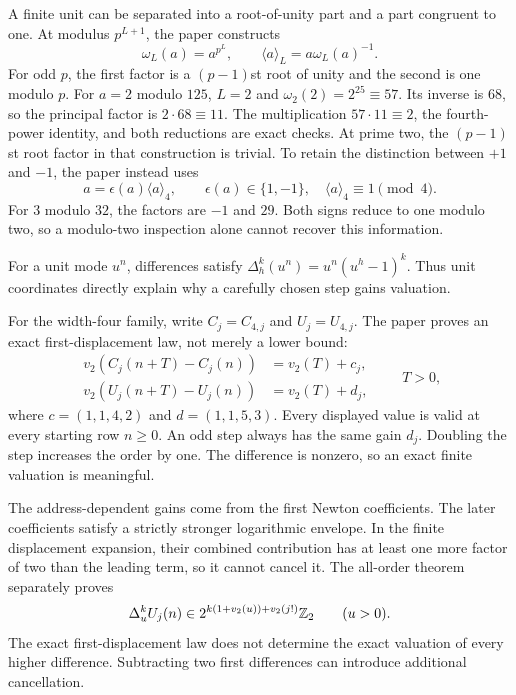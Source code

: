 A finite unit can be separated into a root-of-unity part and a part congruent to one. At modulus $p^{L+1}$, the paper constructs
\[
 \omega_L(a)=a^{p^L},\qquad
 \langle a\rangle_L=a\omega_L(a)^{-1}.
\]
For odd $p$, the first factor is a $(p-1)$st root of unity and the second is one modulo $p$.
For $a=2$ modulo $125$, $L=2$ and $\omega_2(2)=2^{25}\equiv57$. Its inverse is $68$, so the principal factor is $2\cdot68\equiv11$. The multiplication $57\cdot11\equiv2$, the fourth-power identity, and both reductions are exact checks.
At prime two, the $(p-1)$st root factor in that construction is trivial. To retain the distinction between $+1$ and $-1$, the paper instead uses
\[
 a=\epsilon(a)\langle a\rangle_4,\qquad
 \epsilon(a)\in\{1,-1\},\quad\langle a\rangle_4\equiv1\pmod4.
\]
For $3$ modulo $32$, the factors are $-1$ and $29$. Both signs reduce to one modulo two, so a modulo-two inspection alone cannot recover this information.

For a unit mode $u^n$, differences satisfy $\Delta_h^k(u^n)=u^n(u^h-1)^k$. Thus unit coordinates directly explain why a carefully chosen step gains valuation.

For the width-four family, write $C_j=C_{4,j}$ and $U_j=U_{4,j}$. The paper proves an exact first-displacement law, not merely a lower bound:
\[
 \begin{aligned}
 v_2(C_j(n+T)-C_j(n))&=v_2(T)+c_j,\\
 v_2(U_j(n+T)-U_j(n))&=v_2(T)+d_j,
 \end{aligned}\qquad T>0,
\]
where $c=(1,1,4,2)$ and $d=(1,1,5,3)$.
Every displayed value is valid at every starting row $n\ge0$. An odd step always has the same gain $d_j$. Doubling the step increases the order by one. The difference is nonzero, so an exact finite valuation is meaningful.

The address-dependent gains come from the first Newton coefficients. The later coefficients satisfy a strictly stronger logarithmic envelope. In the finite displacement expansion, their combined contribution has at least one more factor of two than the leading term, so it cannot cancel it.
The all-order theorem separately proves
\[
 \Delta_u^k U_j(n)\in
 2^{k(1+v_2(u))+v_2(j!)}\mathbb Z_2\qquad(u>0).
\]
The exact first-displacement law does not determine the exact valuation of every higher difference. Subtracting two first differences can introduce additional cancellation.

